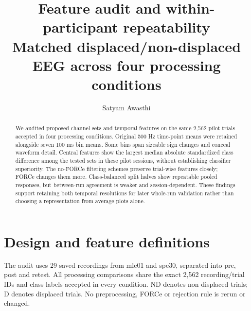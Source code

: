 \documentclass[11pt,a4paper]{article}
\title{Feature audit and within-participant repeatability\\\large Matched displaced/non-displaced EEG across four processing conditions}
\author{Satyam Awasthi}\date{}
\begin{document}
\maketitle
\begin{abstract}
We audited proposed channel sets and temporal features on the same 2,562 pilot trials accepted in four processing conditions. Original 500 Hz time-point means were retained alongside seven 100 ms bin means. Some bins span sizeable sign changes and conceal waveform detail. Central features show the largest median absolute standardized class difference among the tested sets in these pilot sessions, without establishing classifier superiority. The no-FORCe filtering schemes preserve trial-wise features closely; FORCe changes them more. Class-balanced split halves show repeatable pooled responses, but between-run agreement is weaker and session-dependent. These findings support retaining both temporal resolutions for later whole-run validation rather than choosing a representation from average plots alone.
\end{abstract}
\section{Design and feature definitions}
The audit uses 29 saved recordings from mle01 and spe30, separated into pre, post and retest. All processing comparisons share the exact 2,562 recording/trial IDs and class labels accepted in every condition. ND denotes non-displaced trials; D denotes displaced trials. No preprocessing, FORCe or rejection rule is rerun or changed.
\end{document}
